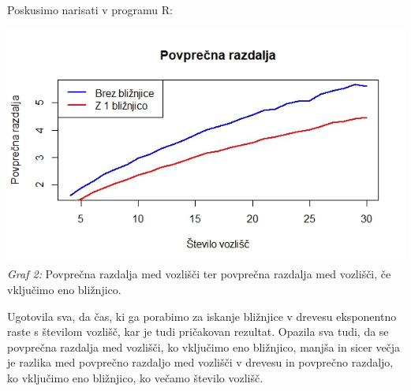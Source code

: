 \documentclass[a4paper,10pt]{article}
\begin{document}
Poskusimo narisati v programu R:
\begin{center}
\includegraphics[scale = 0.8]{povp_razd}\\ 
\scriptsize{\textit{Graf 2: } Povprečna razdalja med vozlišči ter povprečna razdalja med vozlišči, če vključimo eno bližnjico.}
\end{center}


Ugotovila sva, da čas, ki ga porabimo za iskanje bližnjice v drevesu eksponentno raste s številom vozlišč, kar je tudi pričakovan rezultat.
\newline
Opazila sva tudi, da se povprečna razdalja med vozlišči, ko vključimo eno bližnjico, manjša in sicer večja je razlika med povprečno razdaljo med vozlišči v drevesu in povprečno razdaljo, ko vključimo eno bližnjico, ko večamo število vozlišč. 
\end{document}
